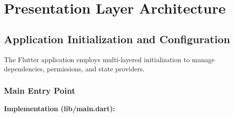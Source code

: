 \documentclass[11pt,a4paper,twoside]{report}
\begin{document}
\newpage

\section{Presentation Layer Architecture}
\label{sec:presentation-layer}

\subsection{Application Initialization and Configuration}
\label{subsec:app-initialization}

The Flutter application employs multi-layered initialization to manage dependencies, permissions, and state providers.

\subsubsection{Main Entry Point}
\label{subsubsec:main-entry-point}

\textbf{Implementation (lib/main.dart):}
\end{document}
